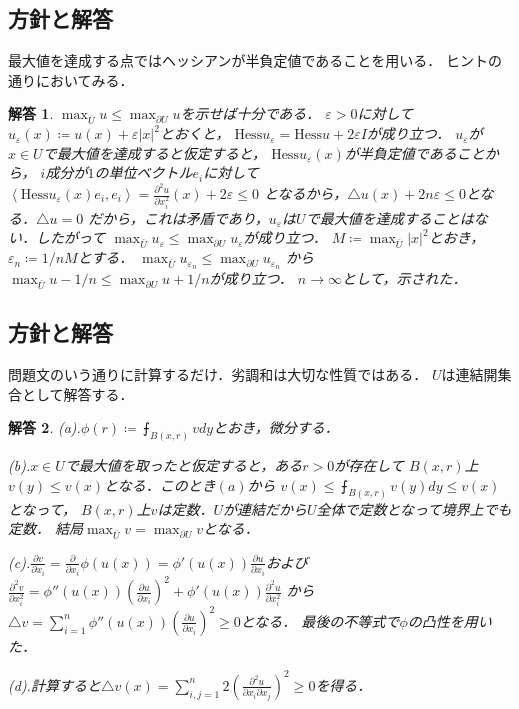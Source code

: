 \documentclass[dvipdfmx,autodetect-engine]{jsarticle}
\newtheorem*{ans}{解答}
\theoremstyle{remark}
\theoremstyle{definition}
\newcommand{\abs}[1]{\left\lvert#1\right\rvert}
\newcommand{\paren}[1]{\left( #1 \right)}
\newcommand{\iprod}[1]{\left\langle #1 \right\rangle}
\begin{document}
\subsection{方針と解答}
最大値を達成する点ではヘッシアンが半負定値であることを用いる．
ヒントの通りにおいてみる．

\begin{ans}
    $\max_{\bar{U}} u \leq \max_{\partial U} u$を示せば十分である．
    $\varepsilon>0$に対して
    $u_{\varepsilon}(x) \coloneqq u(x) + \varepsilon \abs{x}^{2}$とおくと，
    $\mathrm{Hess} u_{\varepsilon} = \mathrm{Hess} u + 2\varepsilon I$が成り立つ．
    $u_{\varepsilon}$が$x \in U$で最大値を達成すると仮定すると，
    $\mathrm{Hess} u_{\varepsilon}(x)$が半負定値であることから，
    $i$成分が$1$の単位ベクトル$e_{i}$に対して
    $\iprod{\mathrm{Hess} u_{\varepsilon}(x) e_{i}, e_{i}} 
    = \frac{\partial^{2}u}{\partial x_{i}^{2}}(x) + 2\varepsilon \leq 0$
    となるから，$\triangle u (x) + 2n\varepsilon \leq 0$となる．$\triangle u=0$
    だから，これは矛盾であり，$u_{\varepsilon}$は$U$で最大値を達成することはない．したがって
    $\max_{\bar{U}} u_{\varepsilon} \leq \max_{\partial U} u_{\varepsilon}$が成り立つ．
    $M \coloneqq \max_{\bar{U}} \abs{x}^{2}$とおき，$\varepsilon_{n} 
    \coloneqq 1/nM$とする．
    $\max_{\bar{U}} u_{\varepsilon_{n}} \leq \max_{\partial U} u_{\varepsilon_{n}}$
    から
    $\max_{\bar{U}} u - 1/n \leq \max_{\partial U}u + 1/n$が成り立つ．
    $n \to \infty$として，示された．
\end{ans}

\subsection{方針と解答}
問題文のいう通りに計算するだけ．劣調和は大切な性質ではある．
$U$は連結開集合として解答する．

\begin{ans}
    (a).$\phi(r) \coloneqq \intbar_{B(x,r)} v dy$とおき，微分する．

    (b).$x \in U$で最大値を取ったと仮定すると，ある$r>0$が存在して
    $B(x,r)$上$v(y) \leq v(x)$となる．このとき$(a)$から
    $v(x) \leq \intbar_{B(x,r)} v(y)dy \leq v(x)$となって，
    $B(x,r)$上$v$は定数．$U$が連結だから$U$全体で定数となって境界上でも定数．
    結局$\max_{\bar{U}} v = \max_{\partial U} v$となる．

    (c).$\frac{\partial v}{\partial x_{i}} = 
    \frac{\partial}{\partial x_{i}} \phi(u(x))
    = \phi'(u(x)) \frac{\partial u}{\partial x_{i}}$および
    $\frac{\partial^{2} v}{\partial x_{i}^{2}} 
    = \phi''(u(x)) \paren{\frac{\partial u}{\partial x_{i}}}^{2}
    + \phi'(u(x)) \frac{\partial^{2} u}{\partial x_{i}^{2}}$
    から$\triangle v = \sum_{i=1}^{n} \phi''(u(x)) 
    \paren{\frac{\partial u}{\partial x_{i}}}^{2} \geq 0$となる．
    最後の不等式で$\phi$の凸性を用いた．

    (d).計算すると$\triangle v(x) = \sum_{i,j=1}^{n} 
    2\paren{\frac{\partial^{2}u}{\partial x_{i} \partial x_{j}}}^{2} \geq 0$を得る．
\end{ans}
\end{document}
